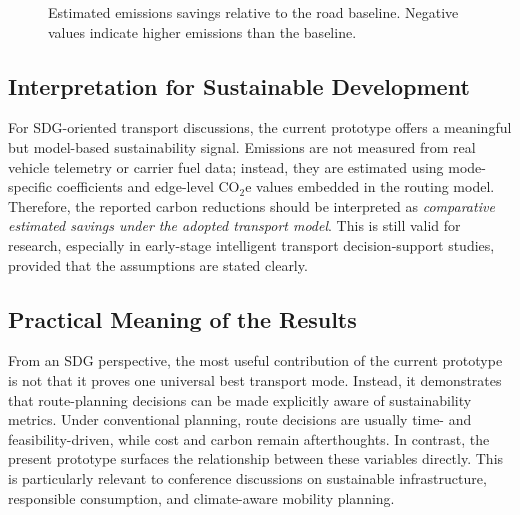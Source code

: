 \begin{figure}[htbp]
\centering
{}
\caption{Estimated emissions savings relative to the road baseline. Negative values indicate higher emissions than the baseline.}
\label{fig:emission-savings}
\end{figure}

\subsection{Interpretation for Sustainable Development}
For SDG-oriented transport discussions, the current prototype offers a meaningful but model-based sustainability signal. Emissions are not measured from real vehicle telemetry or carrier fuel data; instead, they are estimated using mode-specific coefficients and edge-level \(\mathrm{CO_2e}\) values embedded in the routing model. Therefore, the reported carbon reductions should be interpreted as \textit{comparative estimated savings under the adopted transport model}. This is still valid for research, especially in early-stage intelligent transport decision-support studies, provided that the assumptions are stated clearly.

\subsection{Practical Meaning of the Results}
From an SDG perspective, the most useful contribution of the current prototype is not that it proves one universal best transport mode. Instead, it demonstrates that route-planning decisions can be made explicitly aware of sustainability metrics. Under conventional planning, route decisions are usually time- and feasibility-driven, while cost and carbon remain afterthoughts. In contrast, the present prototype surfaces the relationship between these variables directly. This is particularly relevant to conference discussions on sustainable infrastructure, responsible consumption, and climate-aware mobility planning.

